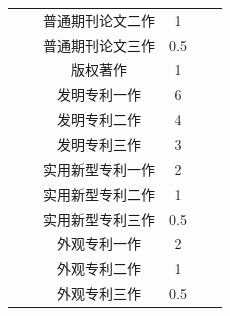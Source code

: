 \documentclass[12pt]{report}
\begin{document}
\begin{table}[htbp]
\begin{tabular}{cccccc}
		& & 普通期刊论文二作 & 1 & & \\ 
		& & 普通期刊论文三作 & 0.5 & & \\ 
		& & 版权著作 & 1 & & \\ 
		& & 发明专利一作 & 6 & & \\ 
		& & 发明专利二作 & 4 & & \\ 
		& & 发明专利三作 & 3 & & \\ 
		& & 实用新型专利一作 & 2 & & \\ 
		& & 实用新型专利二作 & 1 & & \\ 
		& & 实用新型专利三作 & 0.5 & & \\ 
		& & 外观专利一作 & 2 & & \\ 
		& & 外观专利二作 & 1 & & \\ 
		& & 外观专利三作 & 0.5 & & \\ 
		\bottomrule%
	\end{tabular}
	\label{分值表}
\end{table}
\end{document}
